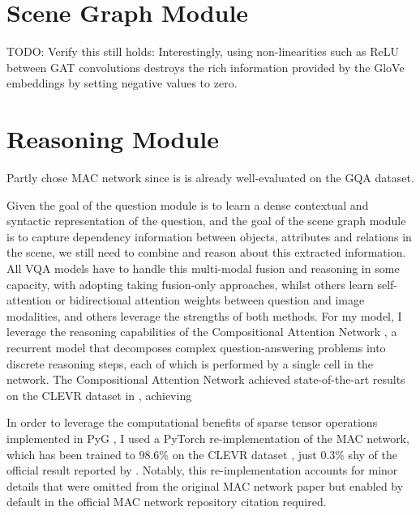 \section{Scene Graph Module}
\label{section:scene_graph_module}

{\color{red} TODO: Verify this still holds: Interestingly, using non-linearities such as ReLU between GAT convolutions destroys the rich information provided by the GloVe embeddings by setting negative values to zero.}

\section{Reasoning Module}
\label{section:reasoning_module}

{\color{red}Partly chose MAC network since is is already well-evaluated on the GQA dataset.}

Given the goal of the question module is to learn a dense contextual and syntactic representation of the question, and the goal of the scene graph module is to capture dependency information between objects, attributes and relations in the scene, we still need to combine and reason about this extracted information. All VQA models have to handle this multi-modal fusion and reasoning in some capacity, with adopting taking fusion-only approaches, whilst others learn self-attention or bidirectional attention weights between question and image modalities, and others leverage the strengths of both methods. For my model, I leverage the reasoning capabilities of the Compositional Attention Network \citeauthor{hudson2018compositional}, a recurrent model that decomposes complex question-answering problems into discrete reasoning steps, each of which is performed by a single cell in the network. The Compositional Attention Network achieved state-of-the-art results on the CLEVR dataset in \citeyear{hudson2018compositional}, achieving 

In order to leverage the computational benefits of sparse tensor operations implemented in PyG \cite{fey2019fast}, I used a PyTorch \cite{paszke2019pytorch} re-implementation of the MAC network, which has been trained to 98.6\% on the CLEVR dataset \cite{eyzaguirre2020differentiable}, just 0.3\% shy of the official result reported by 
\citeauthor{hudson2018compositional}. Notably, this re-implementation accounts for minor details that were omitted from the original MAC network paper but enabled by default in the official MAC network repository {\color{red} citation required}.



